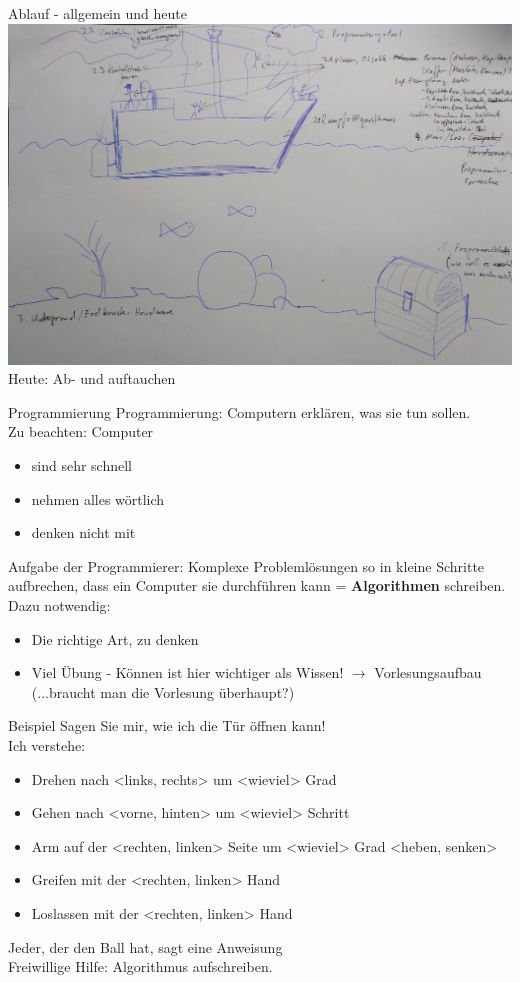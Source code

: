 \documentclass[aspectratio=169,t]{beamer}
\begin{document}
\begin{frame}{Ablauf - allgemein und heute}
	\includegraphics[height=0.7\textheight]{Bilder/VL-Bild.jpg} Heute: Ab- und auftauchen
\end{frame}

\begin{frame}{Programmierung}
	Programmierung: Computern erklären, was sie tun sollen. \\Zu beachten: Computer
	\begin{itemize}
		\item sind sehr schnell
		\item nehmen alles wörtlich
		\item denken nicht mit
	\end{itemize}
	Aufgabe der Programmierer: Komplexe Problemlösungen so in kleine Schritte aufbrechen, dass ein Computer sie durchführen kann = \textbf{Algorithmen} schreiben.\\
	Dazu notwendig:
	\begin{itemize}
		\item Die richtige Art, zu denken
		\item Viel Übung - Können ist hier wichtiger als Wissen! $\rightarrow$ Vorlesungsaufbau (...braucht man die Vorlesung überhaupt?)
	\end{itemize}
\end{frame}

\begin{frame}{Beispiel}
	Sagen Sie mir, wie ich die Tür öffnen kann!\\Ich verstehe:
	\begin{itemize}
		\item Drehen nach <links, rechts> um <wieviel> Grad
		\item Gehen nach <vorne, hinten> um <wieviel> Schritt
		\item Arm auf der <rechten, linken> Seite um <wieviel> Grad <heben, senken>
		\item Greifen mit der <rechten, linken> Hand
		\item Loslassen mit der <rechten, linken> Hand
	\end{itemize}
	Jeder, der den Ball hat, sagt eine Anweisung\\Freiwillige Hilfe: Algorithmus aufschreiben.
\end{frame}
\end{document}
